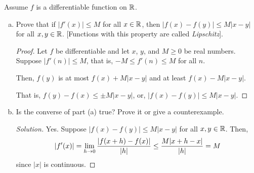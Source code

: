 \question Assume $f$ is a differentiable function on $\mathbb{R}$.
\begin{enumerate}[(a)]
  \item Prove that if $|f'(x)| \leq M$ for all $x \in \mathbb{R}$,
        then $|f(x) - f(y)| \leq M|x-y|$ for all $x,y\in\mathbb{R}$.
          [Functions with this property are called \emph{Lipschitz}].
        \begin{proof}
          Let $f$ be differentiable and let $x$, $y$, and $M \geq 0$ be real numbers.
          Suppose $|f'(n)| \leq M$, that is, $-M \leq f'(n) \leq M$ for all $n$.

          Then, $f(y)$ is at most $f(x) + M|x-y|$ and at least $f(x) - M|x-y|$.

          That is, $f(y) - f(x) \leq \pm M|x-y|$, or, $|f(x)-f(y)| \leq M|x-y|$.
        \end{proof}
  \item Is the converse of part (a) true? Prove it or give a counterexample.
        \begin{proof}[Solution]
          Yes. Suppose $|f(x) - f(y)| \leq M|x-y|$ for all $x,y\in\mathbb{R}$. Then,
          \begin{align*}
            |f'(x)| = \lim_{h\to0}\frac{\abs{f(x+h)-f(x)}}{|h|} \leq \frac{M|x+h-x|}{|h|} = M
          \end{align*}
          since $|x|$ is continuous.
        \end{proof}
\end{enumerate}


